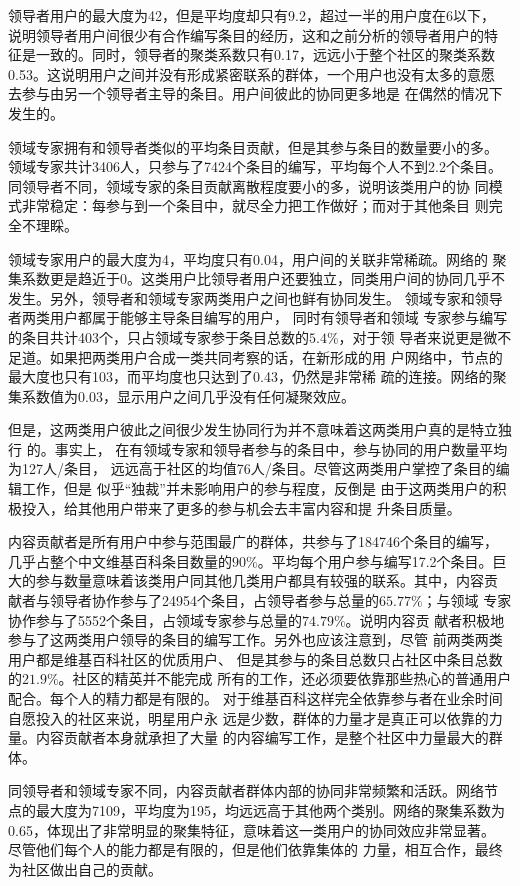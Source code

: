 领导者用户的最大度为42，但是平均度却只有9.2，超过一半的用户度在6以下，
说明领导者用户间很少有合作编写条目的经历，这和之前分析的领导者用户的特
征是一致的。同时，领导者的聚类系数只有0.17，远远小于整个社区的聚类系数
0.53。这说明用户之间并没有形成紧密联系的群体，一个用户也没有太多的意愿
去参与由另一个领导者主导的条目。用户间彼此的协同更多地是
在偶然的情况下发生的。

领域专家拥有和领导者类似的平均条目贡献，但是其参与条目的数量要小的多。
领域专家共计3406人，只参与了7424个条目的编写，平均每个人不到2.2个条目。
同领导者不同，领域专家的条目贡献离散程度要小的多，说明该类用户的协
同模式非常稳定：每参与到一个条目中，就尽全力把工作做好；而对于其他条目
则完全不理睬。

领域专家用户的最大度为4，平均度只有0.04，用户间的关联非常稀疏。网络的
聚集系数更是趋近于0。这类用户比领导者用户还要独立，同类用户间的协同几乎不
发生。另外，领导者和领域专家两类用户之间也鲜有协同发生。
领域专家和领导者两类用户都属于能够主导条目编写的用户，
同时有领导者和领域
专家参与编写的条目共计403个，只占领域专家参于条目总数的$5.4\%$，对于领
导者来说更是微不足道。如果把两类用户合成一类共同考察的话，在新形成的用
户网络中，节点的最大度也只有103，而平均度也只达到了0.43，仍然是非常稀
疏的连接。网络的聚集系数值为0.03，显示用户之间几乎没有任何凝聚效应。

但是，这两类用户彼此之间很少发生协同行为并不意味着这两类用户真的是特立独行
的。事实上，
在有领域专家和领导者参与的条目中，参与协同的用户数量平均为127人/条目，
远远高于社区的均值76人/条目。尽管这两类用户掌控了条目的编辑工作，但是
似乎“独裁”并未影响用户的参与程度，反倒是
由于这两类用户的积极投入，给其他用户带来了更多的参与机会去丰富内容和提
升条目质量。

内容贡献者是所有用户中参与范围最广的群体，共参与了184746个条目的编写，
几乎占整个中文维基百科条目数量的$90\%$。平均每个用户参与编写17.2个条目。巨
大的参与数量意味着该类用户同其他几类用户都具有较强的联系。其中，内容贡
献者与领导者协作参与了24954个条目，占领导者参与总量的$65.77\%$；与领域
专家协作参与了5552个条目，占领域专家参与总量的$74.79\%$。说明内容贡
献者积极地参与了这两类用户领导的条目的编写工作。另外也应该注意到，尽管
前两类两类用户都是维基百科社区的优质用户、
但是其参与的条目总数只占社区中条目总数的$21.9\%$。社区的精英并不能完成
所有的工作，还必须要依靠那些热心的普通用户配合。每个人的精力都是有限的。
对于维基百科这样完全依靠参与者在业余时间自愿投入的社区来说，明星用户永
远是少数，群体的力量才是真正可以依靠的力量。内容贡献者本身就承担了大量
的内容编写工作，是整个社区中力量最大的群体。

同领导者和领域专家不同，内容贡献者群体内部的协同非常频繁和活跃。网络节
点的最大度为7109，平均度为195，均远远高于其他两个类别。网络的聚集系数为
0.65，体现出了非常明显的聚集特征，意味着这一类用户的协同效应非常显著。
尽管他们每个人的能力都是有限的，但是他们依靠集体的
力量，相互合作，最终为社区做出自己的贡献。

